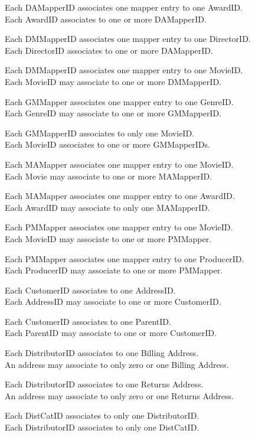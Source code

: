 \documentclass[letterpaper,12pt]{article}
\begin{document}
Each DAMapperID associates one mapper entry to one AwardID.\\
Each AwardID associates to one or more DAMapperID.

Each DMMapperID associates one mapper entry to one DirectorID.\\
Each DirectorID associates to one or more DAMapperID.

Each DMMapperID associates one mapper entry to one MovieID.\\
Each MovieID may associate to one or more DMMapperID.

Each GMMapper associates one mapper entry to one GenreID.\\
Each GenreID may associate to one or more GMMapperID.

Each GMMapperID associates to only one MovieID.\\
Each MovieID associates to one or more GMMapperIDs.

Each MAMapper associates one mapper entry to one MovieID.\\
Each Movie may associate to one or more MAMapperID.

Each MAMapper associates one mapper entry to one AwardID.\\
Each AwardID may associate to only one MAMapperID.

Each PMMapper associates one mapper entry to one MovieID.\\
Each MovieID may associate to one or more PMMapper.

Each PMMapper associates one mapper entry to one ProducerID.\\
Each ProducerID may associate to one or more PMMapper.

Each CustomerID associates to one AddressID.\\
Each AddressID may associate to one or more CustomerID.

Each CustomerID associates to one ParentID.\\
Each ParentID may associate to one or more CustomerID.

Each DistributorID associates to one Billing Address.\\
An address may associate to only zero or one Billing Address.

Each DistributorID associates to one Returns Address.\\
An address may associate to only zero or one Returns Address.

Each DistCatID associates to only one DistributorID.\\
Each DistributorID associates to only one DistCatID.
\end{document}
